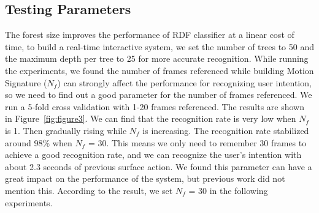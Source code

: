 \subsection{Testing Parameters}
The forest size improves the performance of RDF classifier at a linear cost of time, to build a real-time interactive system, we set the number of trees to 50 and the maximum depth per tree to 25 for more accurate recognition. 
While running the experiments, we found the number of frames referenced while building Motion Signature ($N_{f}$) can strongly affect the performance for recognizing user intention, so we need to find out a good parameter for the number of frames referenced.
We run a 5-fold cross validation with 1-20 frames referenced. The results are shown in Figure~\ref{fig:figure3}.
We can find that the recognition rate is very low when $N_{f}$ is 1. Then gradually rising while $N_{f}$ is increasing.
The recognition rate stabilized around 98\% when $N_{f}$ = 30.
This means we only need to remember 30 frames to achieve a good recognition rate, and we can recognize the user's intention with about 2.3 seconds of previous surface action.
We found this parameter can have a great impact on the performance of the system, but previous work did not mention this. \cite{96bytes}
According to the result, we set $N_{f}$ = 30 in the following experiments.

